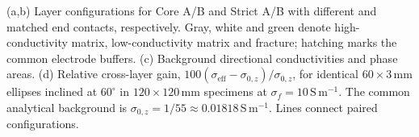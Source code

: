 (a,b) Layer configurations for Core A/B and Strict A/B with different and matched end contacts, respectively. Gray, white and green denote high-conductivity matrix, low-conductivity matrix and fracture; hatching marks the common electrode buffers. (c) Background directional conductivities and phase areas. (d) Relative cross-layer gain, $100(\sigma_{\mathrm{eff}}-\sigma_{0,z})/\sigma_{0,z}$, for identical $60\times3\,\mathrm{mm}$ ellipses inclined at $60^\circ$ in $120\times120\,\mathrm{mm}$ specimens at $\sigma_f=10\,\mathrm{S\,m^{-1}}$. The common analytical background is $\sigma_{0,z}=1/55\approx0.01818\,\mathrm{S\,m^{-1}}$. Lines connect paired configurations.
